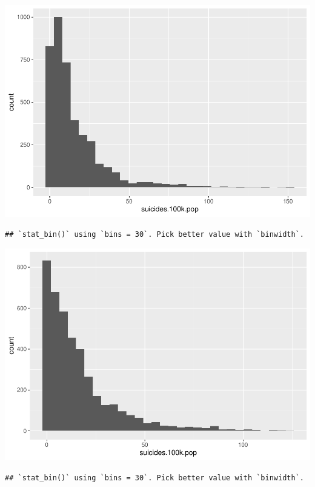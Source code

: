 \documentclass[11pt,]{article}
\begin{document}
\includegraphics{An-Analysis-of-Suicide-Data_files/figure-latex/unnamed-chunk-1-8.pdf}

\begin{verbatim}
## `stat_bin()` using `bins = 30`. Pick better value with `binwidth`.
\end{verbatim}

\includegraphics{An-Analysis-of-Suicide-Data_files/figure-latex/unnamed-chunk-1-9.pdf}

\begin{verbatim}
## `stat_bin()` using `bins = 30`. Pick better value with `binwidth`.
\end{verbatim}
\end{document}
